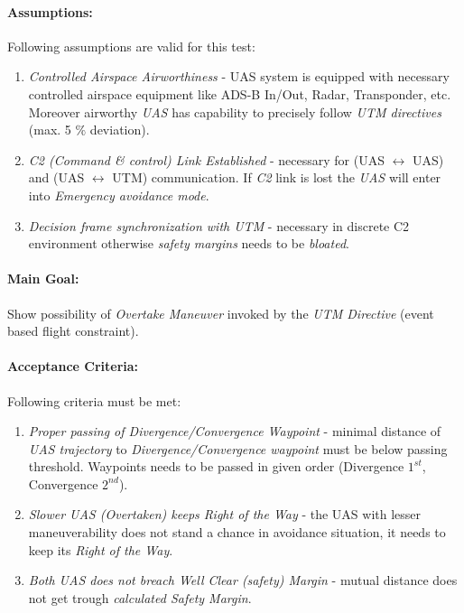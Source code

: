     \paragraph{Assumptions:} Following assumptions are valid for this test:
    
    \begin{enumerate}
        \item \emph{Controlled Airspace Airworthiness} - UAS system is equipped with necessary controlled airspace equipment like ADS-B In/Out, Radar, Transponder, etc. Moreover airworthy \emph{UAS} has capability to precisely follow \emph{UTM directives} (max. 5 $\%$ deviation).
        
        \item \emph{C2 (Command \& control) Link Established} - necessary for (UAS $\leftrightarrow$ UAS) and (UAS $\leftrightarrow$ UTM) communication. If \emph{C2} link is lost the \emph{UAS} will enter into \emph{Emergency avoidance mode}.
        
        \item \emph{Decision frame synchronization with UTM} - necessary in discrete C2 environment otherwise \emph{safety margins} needs to be \emph{bloated}.
    \end{enumerate}
    
    \paragraph{Main Goal:} Show possibility of \emph{Overtake Maneuver} invoked by the \emph{UTM Directive} (event based flight constraint). 
    
    \paragraph{Acceptance Criteria:} Following criteria must be met:
    \begin{enumerate}
        \item \emph{Proper passing of Divergence/Convergence Waypoint} - minimal distance of \emph{UAS trajectory} to \emph{Divergence/Convergence waypoint} must be below passing threshold. Waypoints needs to be passed in given order (Divergence $1^{st}$, Convergence $2^{nd}$).
        
        \item \emph{Slower UAS (Overtaken) keeps Right of the Way} - the UAS with lesser maneuverability does not stand a chance in avoidance situation, it needs to keep its \emph{Right of the Way}. 
        
        \item \emph{Both UAS does not breach Well Clear (safety) Margin} - mutual distance does not get trough \emph{calculated Safety Margin}.
    \end{enumerate}
    
